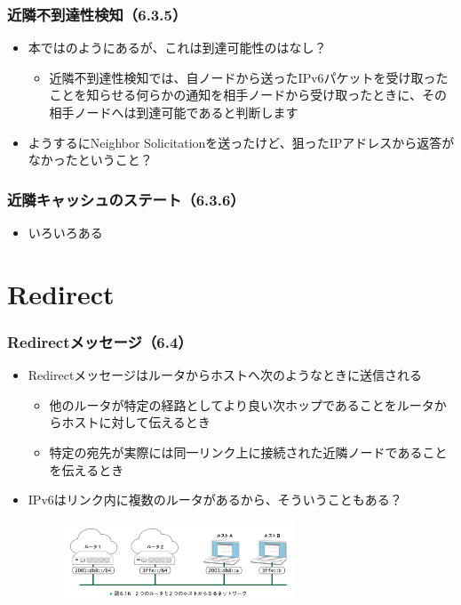 \begin{frame}
  \frametitle{近隣不到達性検知（6.3.5）}
 
  \begin{itemize}
    \item 本ではのようにあるが、これは到達可能性のはなし？
    \begin{itemize}
      \item 近隣不到達性検知では、自ノードから送ったIPv6パケットを受け取ったことを知らせる何らかの通知を相手ノードから受け取ったときに、その相手ノードへは到達可能であると判断します
    \end{itemize}

    \item ようするにNeighbor Solicitationを送ったけど、狙ったIPアドレスから返答がなかったということ？
  \end{itemize}
\end{frame}

\begin{frame}
  \frametitle{近隣キャッシュのステート（6.3.6）}
  
  \begin{itemize}
    \item いろいろある
  \end{itemize}
\end{frame}

\section{Redirect}

\begin{frame}
  \frametitle{Redirectメッセージ（6.4）}

  \begin{itemize}
    \item Redirectメッセージはルータからホストへ次のようなときに送信される
    \begin{itemize}
      \item 他のルータが特定の経路としてより良い次ホップであることをルータからホストに対して伝えるとき
      \item 特定の宛先が実際には同一リンク上に接続された近隣ノードであることを伝えるとき
    \end{itemize}

    \item IPv6はリンク内に複数のルータがあるから、そういうこともある？
    \begin{center}
      \begin{figure}
        \includegraphics[width=0.65\textwidth]{img/figure6_16.png}
      \end{figure}
    \end{center}
  \end{itemize}
\end{frame}

